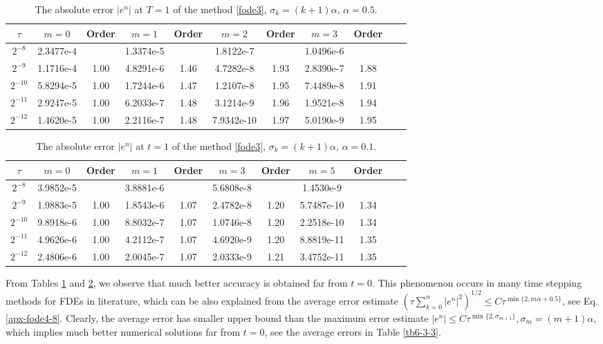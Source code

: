 \documentclass[10pt]{siamltex}
\begin{document}
\begin{table}[!h]
\caption{{The  absolute  error   $|e^n|$ at $T=1$
of the method \eqref{fode3}, $\sigma_k=(k+1)\alpha$,  $\alpha=0.5$.}}\label{tb6-1-2}
\centering\footnotesize
\begin{tabular}{|c|c|c|c|c|c|c|c|c|c|c|}
\hline
 $\tau$ & $m=0$ & Order& $m=1$ & Order& $m=2$ & Order & $m=3$ & Order\\
 \hline
$2^{-8}$ &2.3477e-4&    &1.3374e-5&    &1.8122e-7&    &1.0496e-6&    \\
$2^{-9}$ &1.1716e-4&1.00&4.8291e-6&1.46&4.7282e-8&1.93&2.8390e-7&1.88\\
$2^{-10}$&5.8294e-5&1.00&1.7244e-6&1.47&1.2107e-8&1.95&7.4489e-8&1.91\\
$2^{-11}$&2.9247e-5&1.00&6.2033e-7&1.48&3.1214e-9&1.96&1.9521e-8&1.94\\
$2^{-12}$&1.4620e-5&1.00&2.2116e-7&1.48&7.9342e-10&1.97&5.0190e-9&1.95\\
\hline
\end{tabular}
\end{table}



\begin{table}[!h]
\caption{{The  absolute  error   $|e^n|$ at $t=1$
of the method \eqref{fode3}, $\sigma_k=(k+1)\alpha$,  $\alpha=0.1$.}}\label{tb6-3-2}
\centering\footnotesize
\begin{tabular}{|c|c|c|c|c|c|c|c|c|c|c|}
\hline
 $\tau$ & $m=0$ & Order& $m=1$ & Order& $m=3$ & Order & $m=5$ & Order\\
 \hline
$2^{-8}$ &3.9852e-5 &    &3.8881e-6 &    &5.6808e-8 &    &1.4530e-9 &     \\
$2^{-9}$ &1.9883e-5 &1.00&1.8543e-6 &1.07&2.4782e-8 &1.20&5.7487e-10&1.34 \\
$2^{-10}$&9.8918e-6 &1.00&8.8032e-7 &1.07&1.0746e-8 &1.20&2.2518e-10&1.34 \\
$2^{-11}$&4.9626e-6 &1.00&4.2112e-7 &1.07&4.6920e-9 &1.20&8.8819e-11&1.35 \\
$2^{-12}$&2.4806e-6 &1.00&2.0045e-7 &1.07&2.0333e-9 &1.21&3.4752e-11&1.35 \\
\hline
\end{tabular}
\end{table}

From Tables \ref{tb6-1-2} and \ref{tb6-3-2}, we observe that much better accuracy is obtained far from $t=0$. This phenomenon occurs in many time stepping methods for FDEs in literature, which
can be also explained from the average error estimate
$(\tau\sum_{k=0}^n|e^n|^2)^{1/2}\leq C\tau^{\min\{2,m\alpha+0.5\}}$, see Eq. \eqref{apx-fode4-8}.  Clearly, the average error has smaller upper bound than the maximum error estimate $|e^n|\leq C\tau^{\min\{2,\sigma_{m+1}\}},\sigma_m=(m+1)\alpha$, which implies   much better numerical solutions far from $t=0$, see the average errors in Table \ref{tb6-3-3}.
\end{document}
